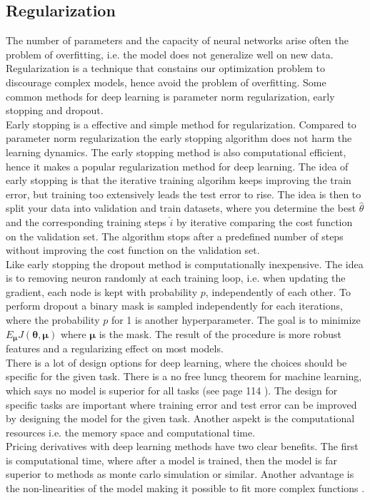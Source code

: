 \subsection{Regularization}\label{regularization}
The number of parameters and the capacity of neural networks arise often the problem of overfitting, i.e. the model does not generalize well on new data. Regularization is a technique that constains our optimization problem to discourage complex models, hence avoid the problem of overfitting. Some common methods for deep learning is parameter norm regularization, early stopping and dropout.\\

Early stopping is a effective and simple method for regularization. Compared to parameter norm regularization the early stopping algorithm does not harm the learning dynamics. The early stopping method is also computational efficient, hence it makes a popular regularization method for deep learning. The idea of early stopping is that the iterative training algorihm keeps improving the train error, but training too extensively leads the test error to rise. The idea is then to split your data into validation and train datasets, where you determine the best $\hat{\theta}$ and the corresponding training steps $\hat{i}$ by iterative comparing the cost function on the validation set. The algorithm stops after a predefined number of steps without improving the cost function on the validation set.\\

Like early stopping the dropout method is computationally inexpensive. The idea is to removing neuron randomly at each training loop, i.e. when updating the gradient, each node is kept with probability $p$, independently of each other. To perform dropout a binary mask is sampled independently for each iterations, where the probability $p$ for 1 is another hyperparameter. The goal is to minimize $E_{\bm{\mu}} J(\bm{\theta}, \bm{\mu})$ where $\bm{\mu}$ is the mask. The result of the procedure is more robust features and a regularizing effect on most models.\\

There is a lot of design options for deep learning, where the choices should be specific for the given task. There is a no free luncg theorem for machine learning, which says no model is superior for all tasks (see page 114 \parencite{Goodfellow-et-al-2016}). The design for specific tasks are important where training error and test error can be improved by designing the model for the given task. Another aspekt is the computational resources i.e. the memory space and computational time. \\

Pricing derivatives with deep learning methods have two clear benefits. The first is computational time, where after a model is trained, then the model is far superior to methods as monte carlo simulation or similar. Another advantage is the non-linearities of the model making it possible to fit more complex functions \parencite{Goodfellow-et-al-2016}.
